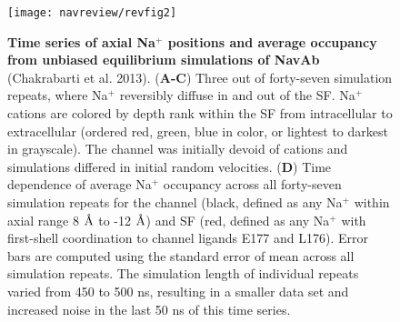 \begin{refsection}
 \begin{figure}[hp]
\centering
\texttt{[image: navreview/revfig2]}
\caption[Time series of axial Na$^{+}$ positions and average occupancy from unbiased equilibrium simulations of NavAb]{\textbf{Time series of axial Na$^{+}$ positions and average occupancy from unbiased equilibrium simulations of NavAb} (Chakrabarti et al. 2013). (\textbf{A-C}) Three out of forty-seven simulation repeats, where Na$^{+}$ reversibly diffuse in and out of the SF.  Na$^{+}$ cations are colored by depth rank within the SF from intracellular to extracellular (ordered red, green, blue in color, or lightest to darkest in grayscale).  The channel was initially devoid of cations and simulations differed in initial random velocities. (\textbf{D}) Time dependence of average Na$^{+}$ occupancy across all forty-seven simulation repeats for the channel (black, defined as any Na$^{+}$ within axial range 8 $\textup{\AA}$ to -12 $\textup{\AA}$) and SF (red, defined as any Na$^{+}$ with first-shell coordination to channel ligands E177 and L176).  Error bars are computed using the standard error of mean across all simulation repeats.  The simulation length of individual repeats varied from 450 to 500 ns, resulting in a smaller data set and increased noise in the last 50 ns of this time series.}
\label{fig:rev2}
\end{figure}


\end{refsection}
